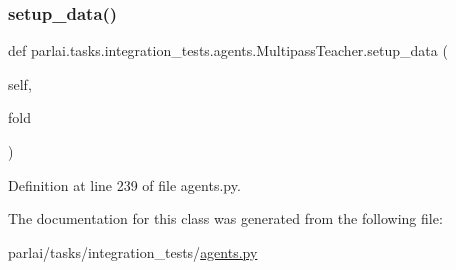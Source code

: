 \mbox{\label{classparlai_1_1tasks_1_1integration__tests_1_1agents_1_1MultipassTeacher_a8f00304abda0184bc641db17143a6204}} 
\subsubsection{\texorpdfstring{setup\+\_\+data()}{setup\_data()}}
{\footnotesize\ttfamily def parlai.\+tasks.\+integration\+\_\+tests.\+agents.\+Multipass\+Teacher.\+setup\+\_\+data (\begin{DoxyParamCaption}\item[{}]{self,  }\item[{}]{fold }\end{DoxyParamCaption})}



Definition at line 239 of file agents.\+py.



The documentation for this class was generated from the following file\+:\begin{DoxyCompactItemize}
\item 
parlai/tasks/integration\+\_\+tests/\hyperlink{parlai_2tasks_2integration__tests_2agents_8py}{agents.\+py}\end{DoxyCompactItemize}
